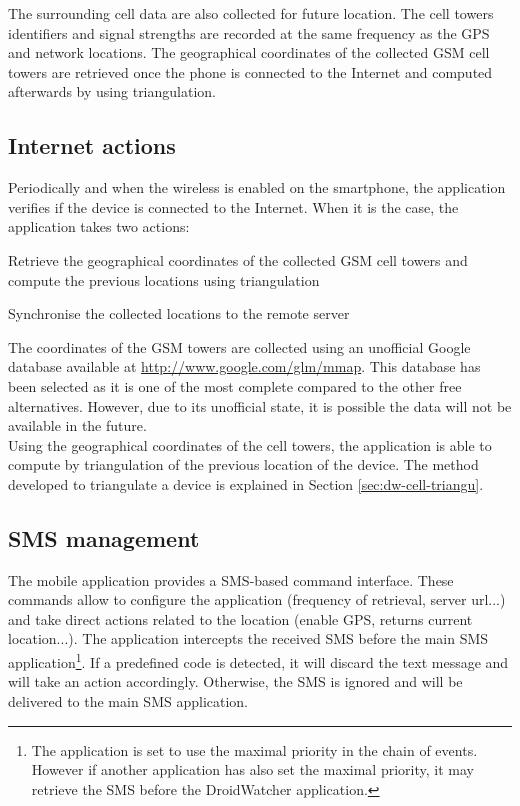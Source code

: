 The surrounding cell data are also collected for future location.
The cell towers identifiers and signal strengths are recorded at the same frequency as the GPS and network locations.
The geographical coordinates of the collected GSM cell towers are retrieved once the phone is connected to the Internet and computed afterwards by using triangulation.

\subsection{Internet actions}
\label{sec:dw-internet-actions}

Periodically and when the wireless is enabled on the smartphone, the application verifies if the device is connected to the Internet.
When it is the case, the application takes two actions:

\begin{itemizealt}
\item Retrieve the geographical coordinates of the collected GSM cell towers and compute the previous locations using triangulation
\item Synchronise the collected locations to the remote server
\end{itemizealt}

The coordinates of the GSM towers are collected using an unofficial Google database available at \url{http://www.google.com/glm/mmap}.
This database has been selected as it is one of the most complete compared to the other free alternatives.
However, due to its unofficial state, it is possible the data will not be available in the future.\\

Using the geographical coordinates of the cell towers, the application is able to compute by triangulation of the previous location of the device.
The method developed to triangulate a device is explained in Section \ref{sec:dw-cell-triangu}.

\subsection{SMS management}
\label{sec:dw-sms-manag}

The mobile application provides a SMS-based command interface.
These commands allow to configure the application (frequency of retrieval, server url...) and take direct actions related to the location (enable GPS, returns current location...).
The application intercepts the received SMS before the main SMS application\footnote{The application is set to use the maximal priority in the chain of events. However if another application has also set the maximal priority, it may retrieve the SMS before the DroidWatcher application.}.
If a predefined code is detected, it will discard the text message and will take an action accordingly.
Otherwise, the SMS is ignored and will be delivered to the main SMS application.\\

